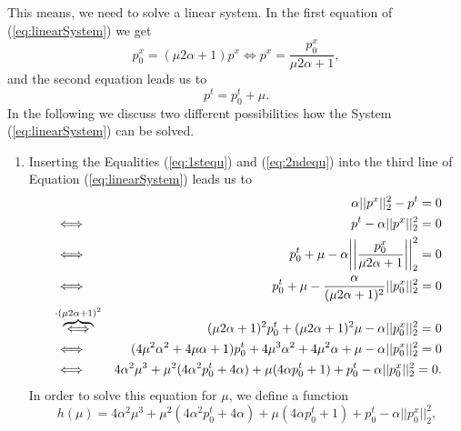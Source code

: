 \documentclass[abstracton]{scrreprt}
\begin{document}
            This means, we need to solve a linear system. In the first equation of (\ref{eq:linearSystem}) we get
                \begin{equation}
                    p_{0}^{x} = (\mu 2 \alpha + 1) p^{x} \iff p^{x} = \frac{p_{0}^{x}}{\mu 2 \alpha + 1}, \label{eq:1stequ}
                \end{equation}
            and the second equation leads us to
                \begin{equation}
                    p^{t} = p_{0}^{t} + \mu. \label{eq:2ndequ}
                \end{equation}
            In the following we discuss two different possibilities how the System (\ref{eq:linearSystem}) can be solved.
            \begin{enumerate}
                \item Inserting the Equalities (\ref{eq:1stequ}) and (\ref{eq:2ndequ}) into the third line of Equation (\ref{eq:linearSystem}) leads us to
                \begin{eqnarray}
                    &&\alpha||p^{x}||_{2}^{2} - p^{t} = 0 \notag \\
                    &\iff& p^{t} - \alpha||p^{x}||_{2}^{2} = 0 \notag \\
                    &\iff& p_{0}^{t} + \mu - \alpha \bigg|\bigg|\frac{p_{0}^{x}}{\mu 2 \alpha + 1}\bigg|\bigg|_{2}^{2} = 0 \notag \\
                    &\iff& p_{0}^{t} + \mu - \frac{\alpha}{(\mu 2 \alpha + 1)^{2}} ||p_{0}^{x}||_{2}^{2} = 0 \notag \\
                    &\overbrace{\iff}^{\cdot (\mu2\alpha + 1)^{2}}& (\mu 2 \alpha + 1)^{2} p_{0}^{t} + (\mu 2 \alpha + 1)^{2} \mu - \alpha ||p_{0}^{x}||_{2}^{2} = 0 \notag \\
                    &\iff& (4 \mu^{2} \alpha^{2} + 4 \mu \alpha + 1) p_{0}^{t} + 4 \mu^{3} \alpha^{2} + 4 \mu^{2} \alpha + \mu - \alpha ||p_{0}^{x}||_{2}^{2} = 0 \notag \\
                    &\iff& 4 \alpha^{2} \mu^{3} + \mu^{2} (4 \alpha^{2} p_{0}^{t} + 4 \alpha) + \mu (4 \alpha p_{0}^{t} + 1) + p_{0}^{t} - \alpha ||p_{0}^{x}||_{2}^{2} = 0. \notag
                \end{eqnarray}
                In order to solve this equation for $\mu$, we define a function
                    $$
                        h(\mu) = 4 \alpha^{2} \mu^{3} + \mu^{2} (4 \alpha^{2} p_{0}^{t} + 4 \alpha) + \mu (4 \alpha p_{0}^{t} + 1) + p_{0}^{t} - \alpha ||p_{0}^{x}||_{2}^{2},
$$
\end{enumerate}
\end{document}
